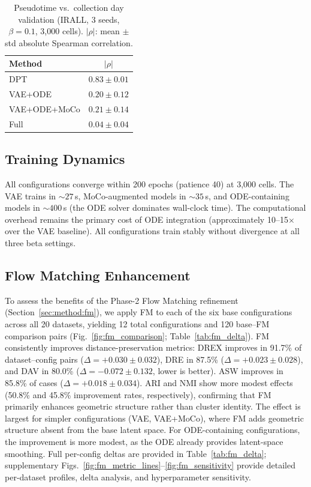 \documentclass[biology,article,submit,pdftex]{Definitions/mdpi}
\begin{document}
\begin{table}[!t]
    \centering
    \caption{Pseudotime vs.\ collection day validation (IRALL, 3 seeds, $\beta{=}0.1$, 3{,}000 cells). $|\rho|$: mean $\pm$ std absolute Spearman correlation.}
    \label{tab:pseudotime_val}
    \begin{tabular}{lc}
        \toprule
        Method & $|\rho|$ \\
        \midrule
        DPT~\cite{haghverdi2016dpt} & $\mathbf{0.83 \pm 0.01}$ \\
        \midrule
        VAE+ODE       & $0.20 \pm 0.12$ \\
        VAE+ODE+MoCo  & $0.21 \pm 0.14$ \\
        Full           & $0.04 \pm 0.04$ \\
        \bottomrule
    \end{tabular}
\end{table}

\subsection{Training Dynamics}
\label{sec:results:training}

All configurations converge within 200 epochs (patience 40) at 3{,}000 cells. The VAE trains in ${\sim}27$\,s, MoCo-augmented models in ${\sim}35$\,s, and ODE-containing models in ${\sim}400$\,s (the ODE solver dominates wall-clock time). The computational overhead remains the primary cost of ODE integration (approximately 10--15$\times$ over the VAE baseline). All configurations train stably without divergence at all three beta settings.

\subsection{Flow Matching Enhancement}
\label{sec:results:fm}

To assess the benefits of the Phase-2 Flow Matching refinement (Section~\ref{sec:method:fm}), we apply FM to each of the six base configurations across all 20 datasets, yielding 12 total configurations and 120 base--FM comparison pairs (Fig.~\ref{fig:fm_comparison}; Table~\ref{tab:fm_delta}). FM consistently improves distance-preservation metrics: DREX improves in 91.7\% of dataset--config pairs ($\Delta{=}+0.030 \pm 0.032$), DRE in 87.5\% ($\Delta{=}+0.023 \pm 0.028$), and DAV in 80.0\% ($\Delta{=}-0.072 \pm 0.132$, lower is better). ASW improves in 85.8\% of cases ($\Delta{=}+0.018 \pm 0.034$). ARI and NMI show more modest effects (50.8\% and 45.8\% improvement rates, respectively), confirming that FM primarily enhances geometric structure rather than cluster identity. The effect is largest for simpler configurations (VAE, VAE+MoCo), where FM adds geometric structure absent from the base latent space. For ODE-containing configurations, the improvement is more modest, as the ODE already provides latent-space smoothing. Full per-config deltas are provided in Table~\ref{tab:fm_delta}; supplementary Figs.~\ref{fig:fm_metric_lines}--\ref{fig:fm_sensitivity} provide detailed per-dataset profiles, delta analysis, and hyperparameter sensitivity.
\end{document}
